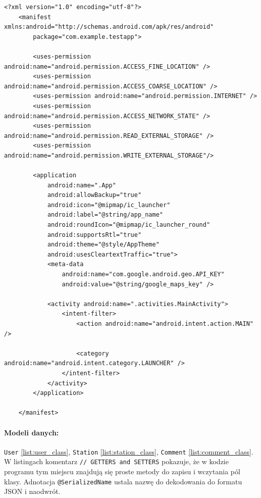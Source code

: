\begin{lstlisting}[label=list:androidManifest,caption=androidManifest.xml,basicstyle=\tiny\ttfamily]
    <?xml version="1.0" encoding="utf-8"?>
    <manifest xmlns:android="http://schemas.android.com/apk/res/android"
        package="com.example.testapp">
    
        <uses-permission android:name="android.permission.ACCESS_FINE_LOCATION" />
        <uses-permission android:name="android.permission.ACCESS_COARSE_LOCATION" />
        <uses-permission android:name="android.permission.INTERNET" />
        <uses-permission android:name="android.permission.ACCESS_NETWORK_STATE" />
        <uses-permission android:name="android.permission.READ_EXTERNAL_STORAGE" />
        <uses-permission android:name="android.permission.WRITE_EXTERNAL_STORAGE"/>
    
        <application
            android:name=".App"
            android:allowBackup="true"
            android:icon="@mipmap/ic_launcher"
            android:label="@string/app_name"
            android:roundIcon="@mipmap/ic_launcher_round"
            android:supportsRtl="true"
            android:theme="@style/AppTheme"
            android:usesCleartextTraffic="true">
            <meta-data
                android:name="com.google.android.geo.API_KEY"
                android:value="@string/google_maps_key" />
    
            <activity android:name=".activities.MainActivity">
                <intent-filter>
                    <action android:name="android.intent.action.MAIN" />
    
                    <category android:name="android.intent.category.LAUNCHER" />
                </intent-filter>
            </activity>
        </application>
    
    </manifest>
\end{lstlisting}

\paragraph{Modeli danych:} \texttt{User} \ref{list:user_class}, \texttt{Station} \ref{list:station_class}, \texttt{Comment} \ref{list:comment_class}. W listingach komentarz \texttt{// GETTERS and SETTERS} pokazuje, że w kodzie programu tym miejscu znajdują się proste metody do zapisu i wczytania pól klasy.
Adnotacja \texttt{@SerializedName} ustala nazwę do dekodowania do formatu JSON i naodwrót.

